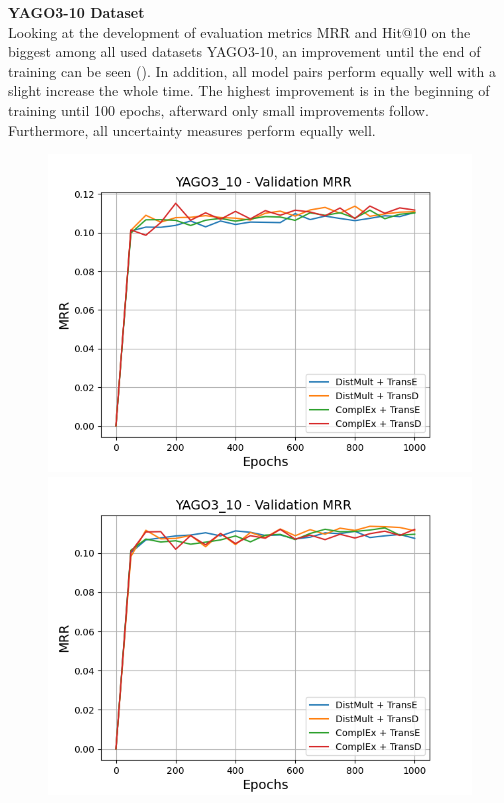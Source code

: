 \textbf{YAGO3-10 Dataset}
\label{subsubsec:metrics_yago3_10}\\
%
Looking at the development of evaluation metrics MRR and Hit@10 on the biggest among all used datasets \textsc{YAGO3-10}, an improvement until the end of training can be seen ().
In addition, all model pairs perform equally well with a slight increase the whole time.
The highest improvement is in the beginning of training until 100 epochs, afterward only  small improvements follow.
Furthermore, all uncertainty measures perform equally well.
\begin{figure}[H]
    \centering
    \begin{minipage}{.5\textwidth}
      \centering
      \includegraphics[width=0.9\linewidth]{figures/results/gan_train/not_pretrained/uncertainty/max_distribution/entropy/yago3_10/1k_epochs/uncertainty_yago3_10_mrrs.png}
    \end{minipage}%
    \begin{minipage}{.5\textwidth}
      \centering
      \includegraphics[width=0.9\linewidth]{figures/results/gan_train/not_pretrained/uncertainty/max_distribution/least_confidence/yago3_10/uncertainty_yago3_10_mrrs.png}

\end{minipage}
\end{figure}

